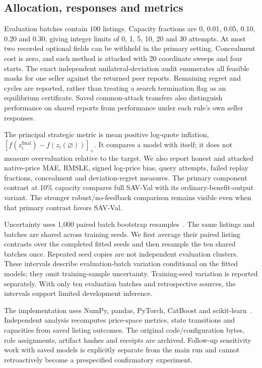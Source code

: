 \subsection{Allocation, responses and metrics}
Evaluation batches contain 100 listings. Capacity fractions are
0, 0.01, 0.05, 0.10, 0.20 and 0.30, giving integer limits of 0, 1, 5, 10,
20 and 30 attempts. At most two recorded optional fields can be withheld
in the primary setting. Concealment cost is zero, and each method is
attacked with 20 coordinate sweeps and four starts. The exact independent
unilateral-deviation audit enumerates all feasible masks for one seller
against the returned peer reports. Remaining regret and cycles are
reported, rather than treating a search termination flag as an
equilibrium certificate. Saved common-attack transfers also distinguish
performance on shared reports from performance under each rule's own
seller responses.

The principal strategic metric is mean positive log-quote inflation,
$[f(z_i^{\mathrm{final}})-f(z_i(\varnothing))]_+$. It compares a model
with itself; it does not measure overvaluation relative to the target.
We also report honest and attacked native-price MAE, RMSLE, signed
log-price bias, query attempts, failed replay fractions, concealment and
deviation-regret measures. The primary component contrast at 10\%
capacity compares full SAV-Val with its ordinary-benefit-output variant.
The stronger robust/no-feedback comparison remains visible even when
that primary contrast favors SAV-Val.

Uncertainty uses 1,000 paired batch bootstrap
resamples~\cite{efron1979bootstrap,cameron2015clusters}. The same listings
and batches are shared across training seeds. We first average their
paired listing contrasts over the completed fitted seeds and then
resample the ten shared batches once. Repeated seed copies are not
independent evaluation clusters. These intervals describe evaluation-batch
variation conditional on the fitted models; they omit training-sample
uncertainty. Training-seed variation is reported separately. With only
ten evaluation batches and retrospective sources, the intervals support
limited development inference.

The implementation uses NumPy, pandas, PyTorch, CatBoost and
scikit-learn~\cite{pedregosa2011sklearn}. Independent analysis recomputes
price-space metrics, state transitions and capacities from saved listing
outcomes. The original code/configuration bytes, role assignments,
artifact hashes and receipts are archived. Follow-up sensitivity work
with saved models is explicitly separate from the main run and cannot
retroactively become a prespecified confirmatory experiment.


